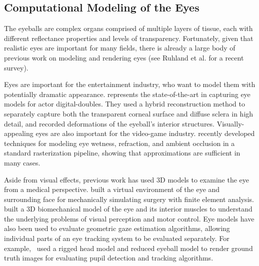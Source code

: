 
\subsection{Computational Modeling of the Eyes}



The eyeballs are complex organs comprised of multiple layers of tissue, each with different reflectance properties and levels of transparency.
Fortunately, given that realistic eyes are important for many fields, there is already a large body of previous work on modeling and rendering eyes (see Ruhland et al. \cite{ruhland2014look} for a recent survey).


Eyes are important for the entertainment industry, who want to model them with potentially dramatic appearance. \citet{berard2014highquality} represents the state-of-the-art in capturing eye models for actor digital-doubles.
They used a hybrid reconstruction method to separately capture both the transparent corneal surface and diffuse sclera in high detail, and recorded deformations of the eyeball's interior structures. Visually-appealing eyes are also important for the video-game industry. \mbox{\citet{ActiBlizEyes}} recently developed techniques for modeling eye wetness, refraction, and ambient occlusion in a standard rasterization pipeline, showing that approximations are sufficient in many cases.

Aside from visual effects, previous work has used 3D models to examine the eye from a medical perspective.
\citet{sagar1994virtual} built a virtual environment of the eye and surrounding face for mechanically simulating surgery with finite element analysis.
\citet{priamikov14_openeyesim} built a 3D biomechanical model of the eye and its interior muscles to understand the underlying problems of visual perception and motor control.
Eye models have also been used to evaluate geometric gaze estimation algorithms, allowing individual parts of an eye tracking system to be evaluated separately.
For example,~\citet{swirski2014rendering} used a rigged head model and reduced eyeball model to render ground truth images for evaluating pupil detection and tracking algorithms.


